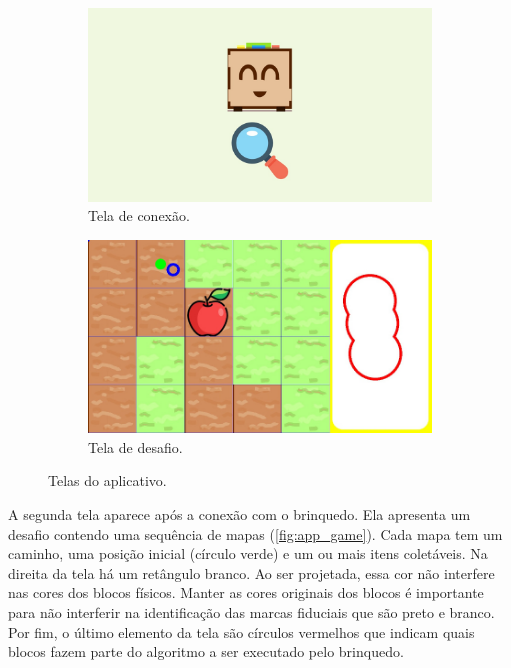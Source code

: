 \begin{figure}[!h]
    \begin{subfigure}{.5\textwidth}
        \centering
        \includegraphics[width=.9\linewidth,fbox]{figs/app_connection.jpeg}
        \caption{Tela de conexão.}
        \label{fig:app_connection}
    \end{subfigure}
    \begin{subfigure}{.5\textwidth}
        \centering
        \includegraphics[width=.9\linewidth,fbox]{figs/app_game.jpeg}
        \caption{Tela de desafio.}
        \label{fig:app_game}
    \end{subfigure}
    \caption{Telas do aplicativo.}
    \label{fig:app_screens}
    \sourceauthor
\end{figure}

A segunda tela aparece após a conexão com o brinquedo. Ela apresenta um desafio contendo uma sequência de mapas (\autoref{fig:app_game}). Cada mapa tem um caminho, uma posição inicial (círculo verde) e um ou mais itens coletáveis. Na direita da tela há um retângulo branco. Ao ser projetada, essa cor não interfere nas cores dos blocos físicos. Manter as cores originais dos blocos é importante para não interferir na identificação das marcas fiduciais que são preto e branco. Por fim, o último elemento da tela são círculos vermelhos que indicam quais blocos fazem parte do algoritmo a ser executado pelo brinquedo. 

